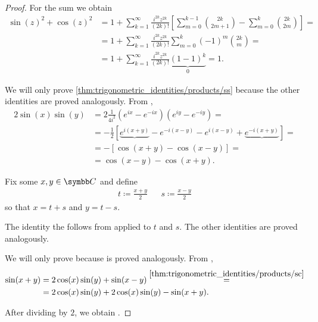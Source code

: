 \begin{proof}
  For the sum we obtain
  \begin{align*}
    \sin(z)^2 + \cos(z)^2
     & =
    1 + \sum_{k=1}^\infty \frac {i^{2k} z^{2k}} {(2k)!} \left[ \sum_{m=0}^{k-1} \binom {2k} {2m+1} - \sum_{m=0}^k \binom {2k} {2m} \right]
    =    \\ &=
    1 + \sum_{k=1}^\infty \frac {i^{2k} z^{2k}} {(2k)!} \sum_{m=0}^k (-1)^m \binom {2k} m
    =    \\ &=
    1 + \sum_{k=1}^\infty \frac {i^{2k} z^{2k}} {(2k)!} \underbrace{(1 - 1)^k}_0
    =
    1.
  \end{align*}

   We will only prove \ref{thm:trigonometric_identities/products/ss} because the other identities are proved analogously. From ,
  \begin{align*}
    2 \sin(x) \sin(y)
     & =
    2 \frac 1 {4i^2} (e^{ix} - e^{-ix}) (e^{iy} - e^{-iy})
    =    \\ &=
    - \frac 1 2 [\underbrace{e^{i(x+y)}} - e^{-i(x-y)} - e^{i(x-y)} + \underbrace{e^{-i(x+y)}}]
    =    \\ &=
    - \left[\cos(x + y) - \cos(x - y)\right]
    =    \\ &=
    \cos(x - y) - \cos(x + y).
  \end{align*}

   Fix some \( x, y \in \BC \) and define
  \begin{align*}
    t \coloneqq \frac {x + y} 2
     &  &
    s \coloneqq \frac {x - y} 2
  \end{align*}
  so that \( x = t + s \) and \( y = t - s \).

  The identity  the follows from  applied to \( t \) and \( s \). The other identities are proved analogously.

   We will only prove  because  is proved analogously. From ,
  \begin{align*}
    \sin(x + y)
     & =
    2 \cos(x) \sin(y) + \sin(x - y)
    \overset {\ref{thm:trigonometric_identities/products/sc}} = \\ &=
    2 \cos(x) \sin(y) + 2 \cos(x) \sin(y) - \sin(x + y).
  \end{align*}

  After dividing by \( 2 \), we obtain .
\end{proof}

